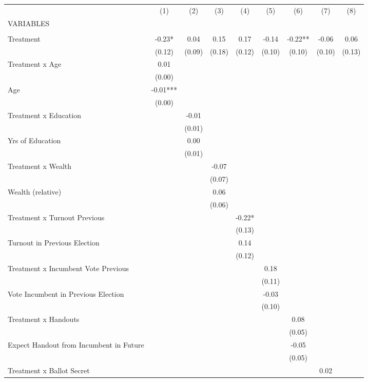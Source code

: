 \begin{tabular}{lcccccccc} \hline
 & (1) & (2) & (3) & (4) & (5) & (6) & (7) & (8) \\
VARIABLES &  &  &  &  &  &  &  &  \\ \hline
 &  &  &  &  &  &  &  &  \\
Treatment & -0.23* & 0.04 & 0.15 & 0.17 & -0.14 & -0.22** & -0.06 & 0.06 \\
 & (0.12) & (0.09) & (0.18) & (0.12) & (0.10) & (0.10) & (0.10) & (0.13) \\
Treatment x Age & 0.01 &  &  &  &  &  &  &  \\
 & (0.00) &  &  &  &  &  &  &  \\
Age & -0.01*** &  &  &  &  &  &  &  \\
 & (0.00) &  &  &  &  &  &  &  \\
Treatment x Education &  & -0.01 &  &  &  &  &  &  \\
 &  & (0.01) &  &  &  &  &  &  \\
Yrs of Education &  & 0.00 &  &  &  &  &  &  \\
 &  & (0.01) &  &  &  &  &  &  \\
Treatment x Wealth &  &  & -0.07 &  &  &  &  &  \\
 &  &  & (0.07) &  &  &  &  &  \\
Wealth (relative) &  &  & 0.06 &  &  &  &  &  \\
 &  &  & (0.06) &  &  &  &  &  \\
Treatment x Turnout Previous &  &  &  & -0.22* &  &  &  &  \\
 &  &  &  & (0.13) &  &  &  &  \\
Turnout in Previous Election &  &  &  & 0.14 &  &  &  &  \\
 &  &  &  & (0.12) &  &  &  &  \\
Treatment x Incumbent Vote Previous &  &  &  &  & 0.18 &  &  &  \\
 &  &  &  &  & (0.11) &  &  &  \\
Vote Incumbent in Previous Election &  &  &  &  & -0.03 &  &  &  \\
 &  &  &  &  & (0.10) &  &  &  \\
Treatment x Handouts &  &  &  &  &  & 0.08 &  &  \\
 &  &  &  &  &  & (0.05) &  &  \\
Expect Handout from Incumbent in Future &  &  &  &  &  & -0.05 &  &  \\
 &  &  &  &  &  & (0.05) &  &  \\
Treatment x Ballot Secret &  &  &  &  &  &  & 0.02 &  \\

\end{tabular}
